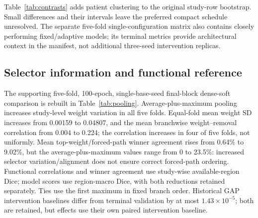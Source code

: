 \documentclass[mathematics,article,submit,pdftex,moreauthors]{Definitions/mdpi}
\begin{document}
\begin{table}[H]
\caption{Completed five-fold, 100-epoch, single-base-seed static schedule study. Dice is the equal-fold
mean of study-wise positive-reference region-macro Dice. Parameters and
active FLOPs are read from the associated run artifacts. FLOP ranges retain
the historical/later profile discrepancy described in Materials and Methods.}
\label{tab:schedules}
\centering
\end{table}

\begin{table}[H]
\caption{Recomputed paired patient-cluster sensitivity for static
simplification. Intervals condition on stored models and preserve the
original region-macro endpoint. No non-inferiority margin was specified.}
\label{tab:contrasts}
\centering\small
\end{table}

Table~\ref{tab:contrasts} adds patient clustering to the original study-row
bootstrap. Small differences and their intervals leave the preferred compact
schedule unresolved. The separate five-fold single-configuration matrix also
contains closely performing fixed/adaptive models; its terminal metrics
provide architectural context in the manifest, not additional three-seed
intervention replicas.

\subsection{Selector information and functional reference}
The supporting five-fold, 100-epoch, single-base-seed final-block dense-soft
comparison is rebuilt in Table~\ref{tab:pooling}. Average-plus-maximum pooling
increases study-level weight variation in all five folds. Equal-fold mean
weight SD increases from 0.00159 to 0.04807, and the mean branchwise
weight--removal correlation from 0.004 to 0.224; the correlation increases
in four of five folds, not uniformly. Mean top-weight/forced-path winner
agreement rises from 0.64\% to 9.02\%, but the average-plus-maximum values
range from 0 to 23.5\%: increased selector variation/alignment does not ensure
correct forced-path ordering. Functional correlations and winner agreement
use study-wise available-region Dice; model scores use region-macro Dice,
with both reductions retained separately. Ties use the first maximum in fixed
branch order. Historical GAP intervention baselines differ from terminal
validation by at most $1.43\times10^{-5}$; both are retained, but effects
use their own paired intervention baseline.
\end{document}
